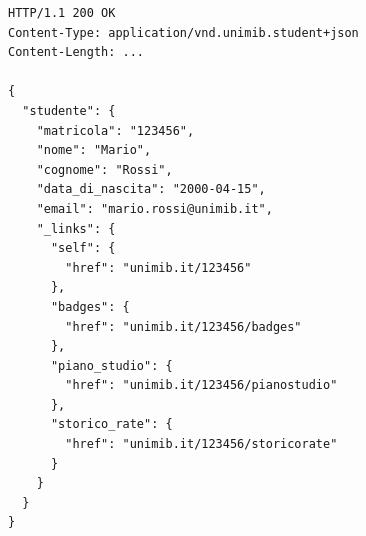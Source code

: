 \begin{lstlisting}
HTTP/1.1 200 OK
Content-Type: application/vnd.unimib.student+json
Content-Length: ...

{
  "studente": {
    "matricola": "123456",
    "nome": "Mario",
    "cognome": "Rossi",
    "data_di_nascita": "2000-04-15",
    "email": "mario.rossi@unimib.it",
    "_links": {
      "self": {
        "href": "unimib.it/123456"
      },
      "badges": {
        "href": "unimib.it/123456/badges"
      },
      "piano_studio": {
        "href": "unimib.it/123456/pianostudio"
      },
      "storico_rate": {
        "href": "unimib.it/123456/storicorate"
      }
    }
  }
}
\end{lstlisting}